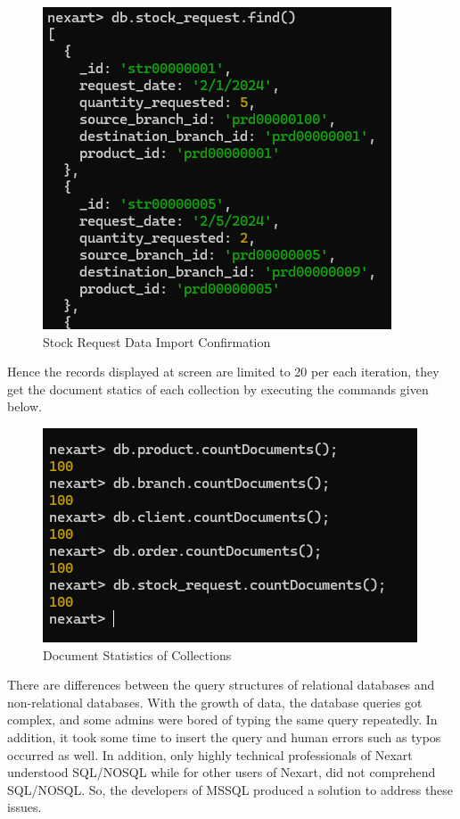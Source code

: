 \documentclass[a4Paper,12pt]{report}
\begin{document}
\begin{itemize}
\begin{figure}[H]
\includegraphics[scale=0.4]{images/stock_request_data_import_confirmation.png}
\caption{Stock Request Data Import Confirmation}
\end{figure}
\end{itemize}
Hence the records displayed at screen are limited to 20 per each iteration, they get the document statics of each collection by executing the commands given below.
\begin{figure}[H]
\centering
\includegraphics[scale=0.5]{images/collections_document_count.png}
\caption{Document Statistics of Collections}
\end{figure}
There are differences between the query structures of relational databases and non-relational databases. With the growth of data, the database queries got complex, and some admins were bored of typing the same query repeatedly. In addition, it took some time to insert the query and human errors such as typos occurred as well. In addition, only highly technical professionals of Nexart understood SQL/NOSQL while for other users of Nexart, did not comprehend SQL/NOSQL. So, the developers of MSSQL produced a solution to address these issues.
\end{document}
